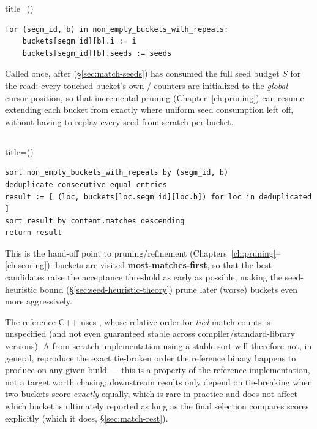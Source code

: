 \begin{algobox}{title={()}}
\begin{verbatim}
for (segm_id, b) in non_empty_buckets_with_repeats:
    buckets[segm_id][b].i := i
    buckets[segm_id][b].seeds := seeds
\end{verbatim}
\end{algobox}

Called once, after  (\S\ref{sec:match-seeds}) has consumed the full seed
budget $S$ for the read: every touched bucket's own / counters are
initialized to the \emph{global} cursor position, so that incremental pruning
(Chapter~\ref{ch:pruning}) can resume extending each bucket from exactly where uniform seed
consumption left off, without having to replay every seed from scratch per bucket.

\subsection{}
\label{sec:get-sorted-buckets}

\begin{algobox}{title={()}}
\begin{verbatim}
sort non_empty_buckets_with_repeats by (segm_id, b)
deduplicate consecutive equal entries
result := [ (loc, buckets[loc.segm_id][loc.b]) for loc in deduplicated ]
sort result by content.matches descending
return result
\end{verbatim}
\end{algobox}

This is the hand-off point to pruning/refinement (Chapters~\ref{ch:pruning}--\ref{ch:scoring}):
buckets are visited \textbf{most-matches-first}, so that the best candidates raise the acceptance
threshold as early as possible, making the seed-heuristic bound (\S\ref{sec:seed-heuristic-theory})
prune later (worse) buckets even more aggressively.

\begin{notebox}
The reference C++ uses , whose relative order for \emph{tied} match counts is
unspecified (and not even guaranteed stable across compiler/standard-library versions). A
from-scratch implementation using a stable sort will therefore not, in general, reproduce the
exact tie-broken order the reference binary happens to produce on any given build --- this is a
property of the reference implementation, not a target worth chasing; downstream results only
depend on tie-breaking when two buckets score \emph{exactly} equally, which is rare in practice
and does not affect which bucket is ultimately reported as long as the final selection compares
scores explicitly (which it does, \S\ref{sec:match-rest}).
\end{notebox}

